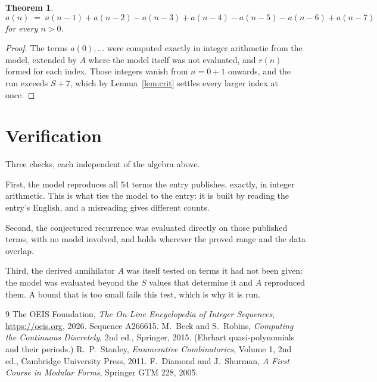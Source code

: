 \documentclass[11pt,a4paper]{article}
\theoremstyle{plain}
\newtheorem{theorem}{Theorem}
\theoremstyle{definition}
\begin{document}
\begin{theorem}
\[
a(n)\;=\;a(n-1) + a(n-2) - a(n-3) + a(n-4) - a(n-5) - a(n-6) + a(n-7)
\]
for every $n>0$.
\end{theorem}

\begin{proof}
The terms $a(0),\dots$ were computed exactly in integer arithmetic from the model, extended by
$A$ where the model itself was not evaluated, and $r(n)$ formed for each index. Those integers
vanish from $n=0+1$ onwards, and the run exceeds $S+7$, which by
Lemma~\ref{lem:crit} settles every larger index at once.
\end{proof}

\section{Verification}

Three checks, each independent of the algebra above.

First, the model reproduces all $54$ terms the entry publishes, exactly, in integer
arithmetic. This is what ties the model to the entry: it is built by reading the entry's
English, and a misreading gives different counts.

Second, the conjectured recurrence was evaluated directly on those published terms, with no
model involved, and holds wherever the proved range and the data overlap.

Third, the derived annihilator $A$ was itself tested on terms it had not been given: the model
was evaluated beyond the $S$ values that determine it and $A$ reproduced them. A bound that is
too small fails this test, which is why it is run.

\begin{thebibliography}{9}
 The OEIS Foundation, \emph{The On-Line Encyclopedia of Integer
Sequences}, \url{https://oeis.org}, 2026. Sequence A266615.
 M.~Beck and S.~Robins, \emph{Computing the Continuous Discretely},
2nd ed., Springer, 2015. (Ehrhart quasi-polynomials and their periods.)
 R.~P.~Stanley, \emph{Enumerative Combinatorics}, Volume 1, 2nd ed.,
Cambridge University Press, 2011.
 F.~Diamond and J.~Shurman, \emph{A First Course in Modular Forms},
Springer GTM 228, 2005.
\end{thebibliography}
\end{document}
